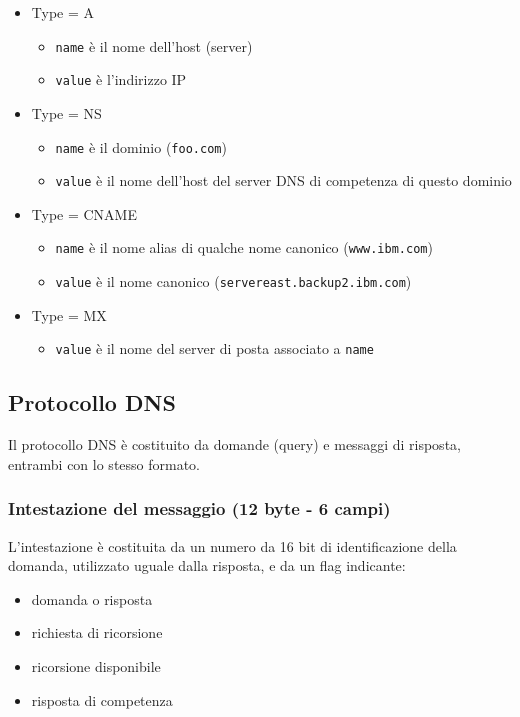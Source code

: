 \documentclass{report}
\newcommand{\code}{\texttt}
\begin{document}
	\begin{itemize}
		\item Type = A
		\begin{itemize}
			\item \code{name} è il nome dell'host (server)
			\item \code{value} è l'indirizzo IP
		\end{itemize}
		\item Type = NS
		\begin{itemize}
			\item \code{name} è il dominio (\code{foo.com})
			\item \code{value} è il nome dell'host del server DNS di competenza di questo dominio
		\end{itemize}
		\item Type = CNAME
		\begin{itemize}
			\item \code{name} è il nome alias di qualche nome canonico (\code{www.ibm.com})
			\item \code{value} è il nome canonico (\code{servereast.backup2.ibm.com})
		\end{itemize}
		\item Type = MX
		\begin{itemize}
			\item \code{value} è il nome del server di posta associato a \code{name}
		\end{itemize}
	\end{itemize}
	\subsection{Protocollo DNS}
	Il protocollo DNS è costituito da domande (query) e messaggi di risposta, entrambi con lo stesso formato.
	\subsubsection{Intestazione del messaggio (12 byte - 6 campi)}
	L'intestazione è costituita da un numero da 16 bit di identificazione della domanda, utilizzato uguale dalla risposta, e da un flag indicante:
	\begin{itemize}
		\item domanda o risposta
		\item richiesta di ricorsione
		\item ricorsione disponibile
		\item risposta di competenza
	\end{itemize}
\end{document}
